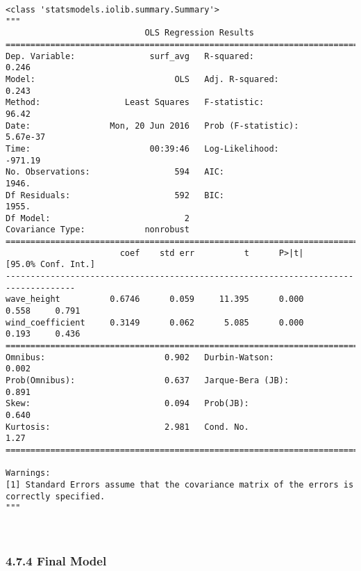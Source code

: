 \documentclass[11pt]{article}
\begin{document}
    
    \begin{verbatim}
<class 'statsmodels.iolib.summary.Summary'>
"""
                            OLS Regression Results                            
==============================================================================
Dep. Variable:               surf_avg   R-squared:                       0.246
Model:                            OLS   Adj. R-squared:                  0.243
Method:                 Least Squares   F-statistic:                     96.42
Date:                Mon, 20 Jun 2016   Prob (F-statistic):           5.67e-37
Time:                        00:39:46   Log-Likelihood:                -971.19
No. Observations:                 594   AIC:                             1946.
Df Residuals:                     592   BIC:                             1955.
Df Model:                           2                                         
Covariance Type:            nonrobust                                         
====================================================================================
                       coef    std err          t      P>|t|      [95.0% Conf. Int.]
------------------------------------------------------------------------------------
wave_height          0.6746      0.059     11.395      0.000         0.558     0.791
wind_coefficient     0.3149      0.062      5.085      0.000         0.193     0.436
==============================================================================
Omnibus:                        0.902   Durbin-Watson:                   0.002
Prob(Omnibus):                  0.637   Jarque-Bera (JB):                0.891
Skew:                           0.094   Prob(JB):                        0.640
Kurtosis:                       2.981   Cond. No.                         1.27
==============================================================================

Warnings:
[1] Standard Errors assume that the covariance matrix of the errors is correctly specified.
"""
    \end{verbatim}

    
    \begin{center}
    \end{center}
    { \hspace*{\fill} \\}
    
    \subsubsection{4.7.4 Final Model}\label{final-model}
\end{document}
